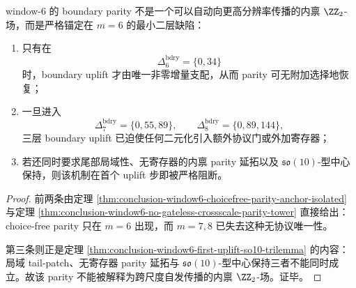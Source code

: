 \begin{corollary}\label{cor:conclusion-window6-boundary-anchor-nonintrinsic-crossscale}
window-\(6\) 的 boundary parity 不是一个可以自动向更高分辨率传播的内禀 \(\ZZ_2\)-场，而是严格锚定在 \(m=6\) 的最小二层缺陷：
\begin{enumerate}
  \item 只有在
  \[
  \Delta_6^{\mathrm{bdry}}=\{0,34\}
  \]
  时，boundary uplift 才由唯一非零增量支配，从而 parity 可无附加选择地恢复；
  \item 一旦进入
  \[
  \Delta_7^{\mathrm{bdry}}=\{0,55,89\},
  \qquad
  \Delta_8^{\mathrm{bdry}}=\{0,89,144\},
  \]
  三层 boundary uplift 已迫使任何二元化引入额外协议门或外加寄存器；
  \item 若还同时要求尾部局域性、无寄存器的内禀 parity 延拓以及 \(\mathfrak{so}(10)\)-型中心保持，则该机制在首个 uplift 步即被严格阻断。
\end{enumerate}
\end{corollary}
\begin{proof}
前两条由定理 \ref{thm:conclusion-window6-choicefree-parity-anchor-isolated} 与定理 \ref{thm:conclusion-window6-no-gateless-crossscale-parity-tower} 直接给出：choice-free parity 只在 \(m=6\) 出现，而 \(m=7,8\) 已失去这种无协议唯一性。

第三条则正是定理 \ref{thm:conclusion-window6-first-uplift-so10-trilemma} 的内容：局域 tail-patch、无寄存器 parity 延拓与 \(\mathfrak{so}(10)\)-型中心保持三者不能同时成立。故该 parity 不能被解释为跨尺度自发传播的内禀 \(\ZZ_2\)-场。证毕。
\end{proof}
